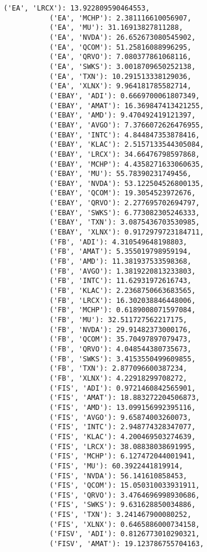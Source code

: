 \documentclass[11pt]{article}
\begin{document}
\begin{Verbatim}[commandchars=\\\{\}]
           ('EA', 'LRCX'): 13.922809590464553,
           ('EA', 'MCHP'): 2.381116610056907,
           ('EA', 'MU'): 31.16913827811288,
           ('EA', 'NVDA'): 26.652673080545902,
           ('EA', 'QCOM'): 51.25816088996295,
           ('EA', 'QRVO'): 7.080377861068116,
           ('EA', 'SWKS'): 3.0018709650252138,
           ('EA', 'TXN'): 10.291513338129036,
           ('EA', 'XLNX'): 9.964181785582714,
           ('EBAY', 'ADI'): 0.6669700061807349,
           ('EBAY', 'AMAT'): 16.369847413421255,
           ('EBAY', 'AMD'): 9.470492419121397,
           ('EBAY', 'AVGO'): 7.3766072626476955,
           ('EBAY', 'INTC'): 4.844847353878416,
           ('EBAY', 'KLAC'): 2.5157133544305084,
           ('EBAY', 'LRCX'): 34.66476798597868,
           ('EBAY', 'MCHP'): 4.4358271633060635,
           ('EBAY', 'MU'): 55.78390231749456,
           ('EBAY', 'NVDA'): 53.122504526800135,
           ('EBAY', 'QCOM'): 19.3054523972676,
           ('EBAY', 'QRVO'): 2.277695702694797,
           ('EBAY', 'SWKS'): 6.773082305246333,
           ('EBAY', 'TXN'): 3.0875436703530985,
           ('EBAY', 'XLNX'): 0.9172979723184711,
           ('FB', 'ADI'): 4.310549648198803,
           ('FB', 'AMAT'): 5.355019798959194,
           ('FB', 'AMD'): 11.381937533598368,
           ('FB', 'AVGO'): 1.3819220813233803,
           ('FB', 'INTC'): 11.62931972616743,
           ('FB', 'KLAC'): 2.2368750663683565,
           ('FB', 'LRCX'): 16.302038846448006,
           ('FB', 'MCHP'): 0.6189008071597084,
           ('FB', 'MU'): 32.511727562217175,
           ('FB', 'NVDA'): 29.91482373000176,
           ('FB', 'QCOM'): 35.70497897079473,
           ('FB', 'QRVO'): 4.048544380735673,
           ('FB', 'SWKS'): 3.4153550499609855,
           ('FB', 'TXN'): 2.877096600387234,
           ('FB', 'XLNX'): 4.22918299708272,
           ('FIS', 'ADI'): 0.9721460842565901,
           ('FIS', 'AMAT'): 18.883272204506873,
           ('FIS', 'AMD'): 13.099156992395116,
           ('FIS', 'AVGO'): 9.65874003260073,
           ('FIS', 'INTC'): 2.948774328347077,
           ('FIS', 'KLAC'): 4.200469503274639,
           ('FIS', 'LRCX'): 38.08838038691995,
           ('FIS', 'MCHP'): 6.127472044001941,
           ('FIS', 'MU'): 60.3922441819914,
           ('FIS', 'NVDA'): 56.141610858453,
           ('FIS', 'QCOM'): 15.050310033931911,
           ('FIS', 'QRVO'): 3.4764696998930686,
           ('FIS', 'SWKS'): 9.631628850034886,
           ('FIS', 'TXN'): 3.241467900080252,
           ('FIS', 'XLNX'): 0.6465886000734158,
           ('FISV', 'ADI'): 0.8126773010290321,
           ('FISV', 'AMAT'): 19.123786755704163,

\end{Verbatim}
\end{document}
